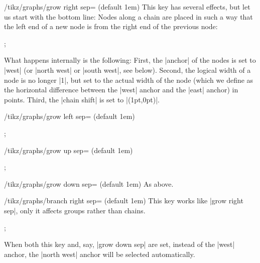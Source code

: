 \begin{key}{/tikz/graphs/grow right sep= (default 1em)}
  This key has several effects, but let us start with the bottom line:
  Nodes along a chain are placed in such a way that the left end of a
  new node is  from the right end of the previous node: 
\begin{codeexample}[]
\tikz {};      
\end{codeexample}
  What happens internally is the following: First, the |anchor| of the
  nodes is set to |west| (or |north west| or |south west|, see
  below). Second, the logical width of a node is no 
  longer |1|, but set to the actual width of the node (which we define
  as the horizontal difference between the |west| anchor and the
  |east| anchor) in points. Third, the |chain shift| is set to
  |(1pt,0pt)|.
\end{key}
\begin{key}{/tikz/graphs/grow left sep= (default 1em)}
\begin{codeexample}[]
\tikz {};      
\end{codeexample}
\end{key}
\begin{key}{/tikz/graphs/grow up sep= (default 1em)}
\begin{codeexample}[]
\tikz {};      
\end{codeexample}
\end{key}
\begin{key}{/tikz/graphs/grow down sep= (default 1em)}
  As above.
\end{key}

\begin{key}{/tikz/graphs/branch right sep= (default 1em)}
  This key works like |grow right sep|, only it affects groups rather
  than chains.
\begin{codeexample}[]
\tikz {};      
\end{codeexample}
  When both this key and, say, |grow down sep| are set, instead of the
  |west| anchor, the |north west| anchor will be selected
  automatically. 
\end{key}

